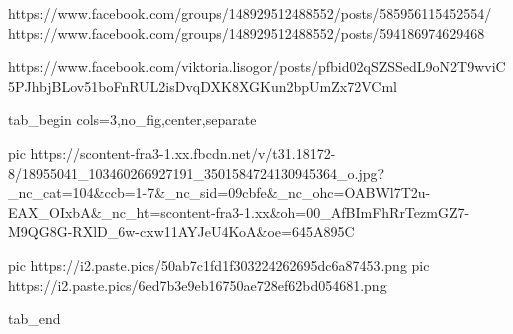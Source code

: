  
 
 
 
 

https://www.facebook.com/groups/148929512488552/posts/585956115452554/
https://www.facebook.com/groups/148929512488552/posts/594186974629468

https://www.facebook.com/viktoria.lisogor/posts/pfbid02qSZSSedL9oN2T9wviC5PJhbjBLov51boFnRUL2isDvqDXK8XGKun2bpUmZx72VCml




\ifcmt
  tab_begin cols=3,no_fig,center,separate

     pic https://scontent-fra3-1.xx.fbcdn.net/v/t31.18172-8/18955041_103460266927191_3501584724130945364_o.jpg?_nc_cat=104&ccb=1-7&_nc_sid=09cbfe&_nc_ohc=OABWl7T2u-EAX_OIxbA&_nc_ht=scontent-fra3-1.xx&oh=00_AfBImFhRrTezmGZ7-M9QG8G-RXlD_6w-cxw11AYJeU4KoA&oe=645A895C

		 pic https://i2.paste.pics/50ab7c1fd1f303224262695dc6a87453.png
		 pic https://i2.paste.pics/6ed7b3e9eb16750ae728ef62bd054681.png

  tab_end
\fi
